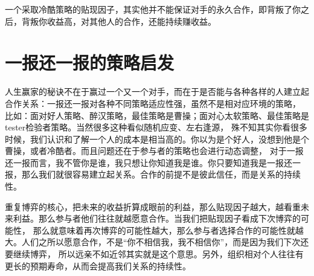 \documentclass[12pt, a4paper]{article}
\begin{document}
\begin{CJK*}{UTF8}{gbsn}
        一个采取冷酷策略的贴现因子，其实他并不能保证对手的永久合作，即背叛了你之后，背叛你收益高，对其他人的合作，还能持续赚收益。

        \section{一报还一报的策略启发}
        人生赢家的秘诀不在于赢过一个又一个对手，而在于是否能与各种各样的人建立起合作关系：一报还一报对各种不同策略适应性强，虽然不是相对应环境的策略，
        比如：面对好人策略、醉汉策略，最佳策略是曹操；面对心太软策略、最佳策略是tester检验者策略。当然很多这种看似随机应变、左右逢源，
        殊不知其实你看很多时候，我们认识和了解一个人的成本是相当高的。你以为是个好人，没想到他是个曹操，或者冷酷者。而且问题还在于参与者的策略也会进行动态调整，
        对于一报还一报而言，我不管你是谁，我只想让你知道我是谁。你只要知道我是一报还一报，那么我们就很容易建立起关系。合作的前提不是彼此信任，而是关系的持续性。\par

        重复博弈的核心，把未来的收益折算成眼前的利益，那么贴现因子越大，越看重未来利益。那么参与者他们往往就越愿意合作。当我们把贴现因子看成下次博弈的可能性，
        那么就意味着再次博弈的可能性越大，那么参与者选择合作的可能性就越大。人们之所以愿意合作，不是“你不相信我，我不相信你”，而是因为我们下次还要继续博弈，
        所以远亲不如近邻其实就是这个意思。另外，组织相对个人往往有更长的预期寿命，从而会提高我们关系的持续性。\par



    \end{CJK*}
\end{document}

